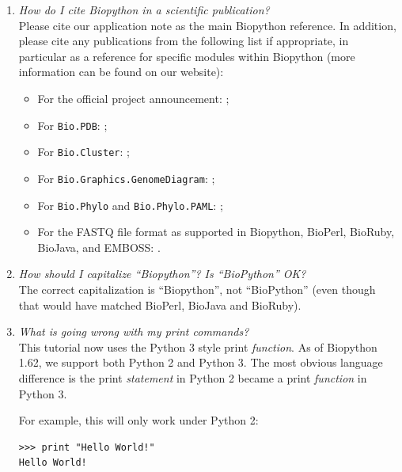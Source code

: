 \documentclass{report}
\begin{document}
\begin{enumerate}

  \item \emph{How do I cite Biopython in a scientific publication?} \\
  Please cite our application note \cite[Cock \textit{et al.}, 2009]{cock2009}
  as the main Biopython reference.
  In addition, please cite any publications from the following list if appropriate, in particular as a reference for specific modules within Biopython (more information can be found on our website):
  \begin{itemize}
    \item For the official project announcement: \cite[Chapman and Chang, 2000]{chapman2000};
    \item For \verb+Bio.PDB+: \cite[Hamelryck and Manderick, 2003]{hamelryck2003a};
    \item For \verb+Bio.Cluster+: \cite[De Hoon \textit{et al.}, 2004]{dehoon2004};
    \item For \verb+Bio.Graphics.GenomeDiagram+: \cite[Pritchard \textit{et al.}, 2006]{pritchard2006};
    \item For \verb+Bio.Phylo+ and \verb+Bio.Phylo.PAML+: \cite[Talevich \textit{et al.}, 2012]{talevich2012};
    \item For the FASTQ file format as supported in Biopython, BioPerl, BioRuby, BioJava, and EMBOSS: \cite[Cock \textit{et al.}, 2010]{cock2010}.
  \end{itemize}

  \item \emph{How should I capitalize ``Biopython''?  Is ``BioPython'' OK?} \\
  The correct capitalization is ``Biopython'', not ``BioPython'' (even though
  that would have matched BioPerl, BioJava and BioRuby).

  \item \emph{What is going wrong with my print commands?} \\
  This tutorial now uses the Python 3 style print \emph{function}.
  As of Biopython 1.62, we support both Python 2 and Python 3.
  The most obvious language difference is the print \emph{statement}
  in Python 2 became a print \emph{function} in Python 3.

  For example, this will only work under Python 2:

\begin{verbatim}
>>> print "Hello World!"
Hello World!
\end{verbatim}


\end{enumerate}
\end{document}
